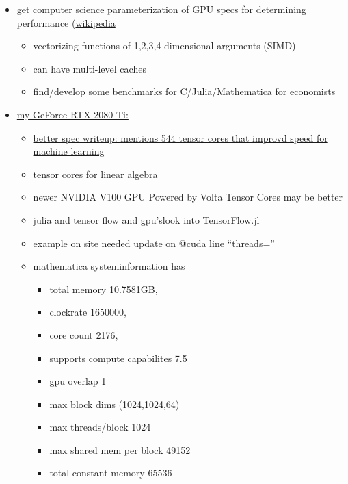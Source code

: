 \documentclass[hyperref,idxtotoc]{labbook}
\begin{document}
   \begin{itemize}
   \item get computer science parameterization of GPU specs for determining performance  (\href{https://en.wikipedia.org/wiki/General-purpose_computing_on_graphics_processing_units}{wikipedia}
     \begin{itemize}
     \item vectorizing functions of 1,2,3,4 dimensional arguments  (SIMD)
     \item can have multi-level caches 

   \item find/develop some benchmarks for C/Julia/Mathematica for economists


     \end{itemize}
     \item  \href{https://www.nvidia.com/en-gb/geforce/graphics-cards/rtx-2080-ti/}{my GeForce RTX 2080 Ti:} 
     \begin{itemize}
     \item  \href{https://www.techpowerup.com/gpu-specs/geforce-rtx-2080-ti.c3305}{better spec writeup: mentions 544 tensor cores that improvd speed for machine learning}
       
     \item \href{https://www.nvidia.com/en-gb/data-center/tensorcore/}{tensor cores for linear algebra}
     \item newer NVIDIA V100 GPU Powered by Volta Tensor Cores may be better
     \item \href{https://devblogs.nvidia.com/gpu-computing-julia-programming-language/}{julia and tensor flow and gpu's}look into TensorFlow.jl
       
     \item example on site needed update on @cuda line  ``threads=''
\item
 mathematica systeminformation has 
       \begin{itemize}
       \item total memory 10.7581GB,
       \item  clockrate 1650000, 
       \item core count 2176,
       \item supports compute capabilites 7.5
       \item gpu overlap 1
       \item max block dims (1024,1024,64)
       \item max threads/block 1024
       \item max shared mem per block 49152
       \item total constant memory 65536


\end{itemize}
\end{itemize}
\end{itemize}
\end{document}
